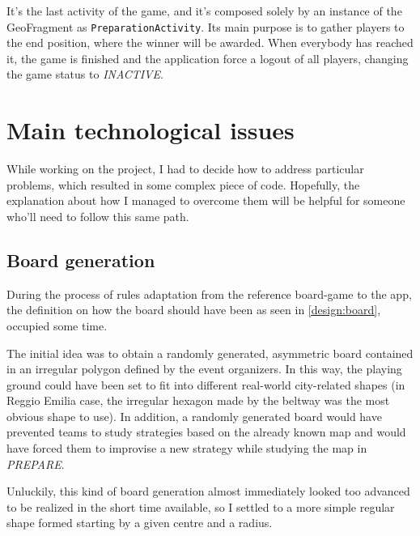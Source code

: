 		It's the last activity of the game, and it's composed solely by an instance of the GeoFragment as \lstinline|PreparationActivity|.
		Its main purpose is to gather players to the end position, where the winner will be awarded. When everybody has reached it, the game is finished and the application force a logout of all players, changing the game status to \emph{INACTIVE}.
	
	\section{Main technological issues}
		
		While working on the project, I had to decide how to address particular problems, which resulted in some complex piece of code.
		Hopefully, the explanation about how I managed to overcome them will be helpful for someone who'll need to follow this same path.
		
		\subsection{Board generation}\label{focus:board}
		
			During the process of rules adaptation from the reference board-game to the app, the definition on how the board should have been as seen in \autoref{design:board}, occupied some time.
			
			The initial idea was to obtain a randomly generated, asymmetric board contained in an irregular polygon defined by the event organizers.
			In this way, the playing ground could have been set to fit into different real-world city-related shapes (in Reggio Emilia case, the irregular hexagon made by the beltway was the most obvious shape to use).
			In addition, a randomly generated board would have prevented teams to study strategies based on the already known map and would have forced them to improvise a new strategy while studying the map in \emph{PREPARE}.
			
			Unluckily, this kind of board generation almost immediately looked too advanced to be realized in the short time available, so I settled to a more simple regular shape formed starting by a given centre and a radius.
			
